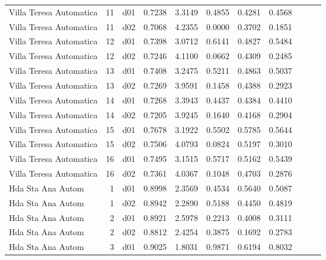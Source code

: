 \begin{landscape}
\begin{longtable}{p{2cm}rrrrrrrrrr}
 Villa Teresa Automatica  &         11 &     d01 &   0.7238 &  3.3149 &        0.4855 &           0.4281 &  0.4568 \\
 Villa Teresa Automatica  &         11 &     d02 &   0.7068 &  4.2355 &        0.0000 &           0.3702 &  0.1851 \\
 Villa Teresa Automatica  &         12 &     d01 &   0.7398 &  3.0712 &        0.6141 &           0.4827 &  0.5484 \\
 Villa Teresa Automatica  &         12 &     d02 &   0.7246 &  4.1100 &        0.0662 &           0.4309 &  0.2485 \\
 Villa Teresa Automatica  &         13 &     d01 &   0.7408 &  3.2475 &        0.5211 &           0.4863 &  0.5037 \\
 Villa Teresa Automatica  &         13 &     d02 &   0.7269 &  3.9591 &        0.1458 &           0.4388 &  0.2923 \\
 Villa Teresa Automatica  &         14 &     d01 &   0.7268 &  3.3943 &        0.4437 &           0.4384 &  0.4410 \\
 Villa Teresa Automatica  &         14 &     d02 &   0.7205 &  3.9245 &        0.1640 &           0.4168 &  0.2904 \\
 Villa Teresa Automatica  &         15 &     d01 &   0.7678 &  3.1922 &        0.5502 &           0.5785 &  0.5644 \\
 Villa Teresa Automatica  &         15 &     d02 &   0.7506 &  4.0793 &        0.0824 &           0.5197 &  0.3010 \\
 Villa Teresa Automatica  &         16 &     d01 &   0.7495 &  3.1515 &        0.5717 &           0.5162 &  0.5439 \\
 Villa Teresa Automatica  &         16 &     d02 &   0.7361 &  4.0367 &        0.1048 &           0.4703 &  0.2876 \\
       Hda Sta Ana Autom  &          1 &     d01 &   0.8998 &  2.3569 &        0.4534 &           0.5640 &  0.5087 \\
       Hda Sta Ana Autom  &          1 &     d02 &   0.8942 &  2.2890 &        0.5188 &           0.4450 &  0.4819 \\
       Hda Sta Ana Autom  &          2 &     d01 &   0.8921 &  2.5978 &        0.2213 &           0.4008 &  0.3111 \\
       Hda Sta Ana Autom  &          2 &     d02 &   0.8812 &  2.4254 &        0.3875 &           0.1692 &  0.2783 \\
       Hda Sta Ana Autom  &          3 &     d01 &   0.9025 &  1.8031 &        0.9871 &           0.6194 &  0.8032 \\

\end{longtable}
\end{landscape}
